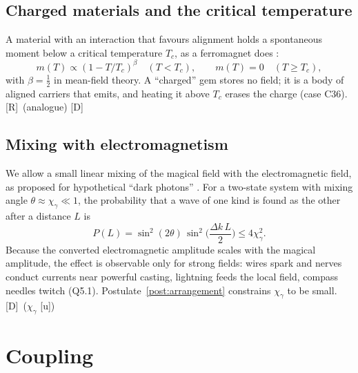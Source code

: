 \documentclass[11pt,a4paper]{article}
\numberwithin{equation}{section}
\theoremstyle{definition}
\theoremstyle{plain}
\theoremstyle{remark}
\newcommand{\tagD}{\textcolor{tag}{\textsf{[D]}}}
\newcommand{\tagR}{\textcolor{tag}{\textsf{[R]}}}
\newcommand{\tagU}{\textcolor{tag}{\textsf{[u]}}}
\begin{document}
\subsection{Charged materials and the critical temperature}
A material with an interaction that favours alignment holds a spontaneous moment below a critical temperature $T_c$, as a ferromagnet does \cite{kittel}:
\begin{equation}
m(T)\propto (1-T/T_c)^{\beta}\quad (T<T_c),\qquad m(T)=0\quad (T\ge T_c),
\end{equation}
with $\beta=\tfrac12$ in mean-field theory. A ``charged'' gem stores no field; it is a body of aligned carriers that emits, and heating it above $T_c$ erases the charge (case C36). \tagR\ (analogue) \tagD

\subsection{Mixing with electromagnetism}\label{sec:mixing}
We allow a small linear mixing of the magical field with the electromagnetic field, as proposed for hypothetical ``dark photons'' \cite{holdom}. For a two-state system with mixing angle $\theta\approx\chi_{\gamma}\ll1$, the probability that a wave of one kind is found as the other after a distance $L$ is
\begin{equation}
P(L)=\sin^2(2\theta)\,\sin^2\!\Big(\frac{\Delta k\,L}{2}\Big)\le 4\chi_{\gamma}^2 .
\end{equation}
Because the converted electromagnetic amplitude scales with the magical amplitude, the effect is observable only for strong fields: wires spark and nerves conduct currents near powerful casting, lightning feeds the local field, compass needles twitch (Q5.1). Postulate~\ref{post:arrangement} constrains $\chi_\gamma$ to be small. \tagD\ ($\chi_\gamma$ \tagU)

\section{Coupling}\label{sec:coupling}
\end{document}
